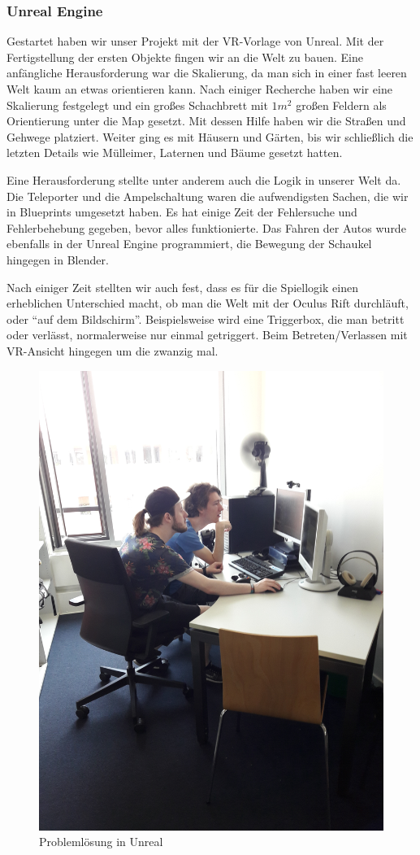 \documentclass{Bericht}
\begin{document}
		\subsubsection{Unreal Engine}
			Gestartet haben wir unser Projekt mit der VR-Vorlage von Unreal. Mit der Fertigstellung der ersten Objekte fingen wir an die Welt zu bauen. Eine anfängliche Herausforderung war die Skalierung, da man sich in einer fast leeren Welt kaum an etwas orientieren kann. Nach einiger Recherche haben wir eine Skalierung festgelegt und ein großes Schachbrett mit $1m^{2}$ großen Feldern als Orientierung unter die Map gesetzt. Mit dessen Hilfe haben wir die Straßen und Gehwege platziert. Weiter ging es mit Häusern und Gärten, bis wir schließlich die letzten Details wie Mülleimer, Laternen und Bäume gesetzt hatten. 
			
			Eine Herausforderung stellte unter anderem auch die Logik in unserer Welt da. Die Teleporter und die Ampelschaltung waren die aufwendigsten Sachen, die wir in Blueprints umgesetzt haben. Es hat einige Zeit der Fehlersuche und Fehlerbehebung gegeben, bevor alles funktionierte. Das Fahren der Autos wurde ebenfalls in der Unreal Engine programmiert, die Bewegung der Schaukel hingegen in Blender.
			
			Nach einiger Zeit stellten wir auch fest, dass es für die Spiellogik einen erheblichen Unterschied macht, ob man die Welt mit der Oculus Rift durchläuft, oder "`auf dem Bildschirm"'. Beispielsweise wird eine Triggerbox, die man betritt oder verlässt, normalerweise nur einmal getriggert. Beim Betreten/Verlassen mit VR-Ansicht hingegen um die zwanzig mal.
			
		\begin{figure}[!htbp] %
			\centering
			\includegraphics[trim = 200mm 0mm 600mm 0mm, clip, height=\linewidth, width=\textheight, keepaspectratio, angle=270]{../Bilder/20170619_102101.jpg} %
			\caption{Problemlösung in Unreal}
			\label{img:porblemloesung}
		\end{figure}
		
\end{document}
